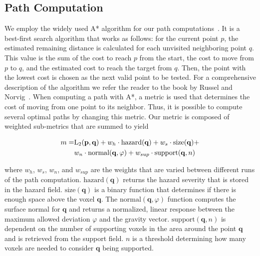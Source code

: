 \documentclass[conference,10pt,letter]{IEEEtran}
\begin{document}
\subsection{Path Computation} \label{sec:overview:pathcomputation}
We employ the widely used A* algorithm for our path computations~\cite{4082128}. It is a best-first search algorithm that works as follows: for the current point $p$, the estimated remaining distance is calculated for each unvisited neighboring point $q$. This value is the sum of the cost to reach $p$ from the start, the cost to move from $p$ to $q$, and the estimated cost to reach the target from $q$. Then, the point with the lowest cost is chosen as the next valid point to be tested. For a comprehensive description of the algorithm we refer the reader to the book by Russel and Norvig~\cite{AStar}. When computing a path with A*, a metric is used that determines the cost of moving from one point to its neighbor. Thus, it is possible to compute several optimal paths by changing this metric. Our metric is composed of weighted sub-metrics that are summed to yield

\begin{equation}
\begin{array}{r@{}l}
m = & \textrm{L}_2(\mathbf{p},\mathbf{q}) + w_h \cdot \textrm{hazard}(\mathbf{q}) + w_s \cdot \textrm{size}(\mathbf{q}) + \vspace*{0.1cm} \\
  & w_n \cdot \textrm{normal}(\mathbf{q},\varphi) + w_{sup} \cdot \textrm{support}(\mathbf{q},n)
\end{array}
\end{equation}

\noindent where $w_h$, $w_s$, $w_n$, and $w_{sup}$ are the weights that are varied between different runs of the path computation. $\textrm{hazard}(\mathbf{q})$ returns the hazard severity that is stored in the hazard field. $\textrm{size}(\mathbf{q})$ is a binary function that determines if there is enough space above the voxel $\mathbf{q}$. The $\textrm{normal}(\mathbf{q},\varphi)$ function computes the surface normal for $\mathbf{q}$ and returns a normalized, linear response between the maximum allowed deviation $\varphi$ and the gravity vector. $\mathrm{support}(\mathbf{q},n)$ is dependent on the number of supporting voxels in the area around the point $\mathbf{q}$ and is retrieved from the support field. $n$ is a threshold determining how many voxels are needed to consider $\mathbf{q}$ being supported.
\end{document}
